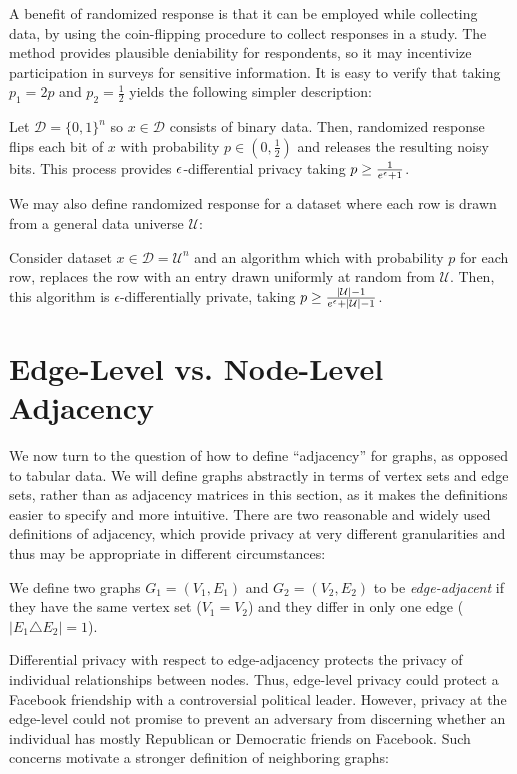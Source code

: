 A benefit of randomized response is that it can be employed while collecting data, by using the coin-flipping procedure to collect responses in a study. The method provides plausible deniability for respondents, so it may incentivize participation in surveys for sensitive information.  It is easy to verify that taking $p_1 = 2p$ and $p_2 = \frac{1}{2}$ yields the following simpler description:

\begin{theorem}
	\label{thm:rr}
	Let $\mathcal{D} = \{0,1\}^n$ so $x \in \mathcal{D}$ consists of binary data. Then, randomized response flips each bit of $x$ with probability $p \in (0, \frac{1}{2})$ and releases the resulting noisy bits. This process provides $\epsilon$-differential privacy taking  $p \geq \frac{1}{e^\epsilon + 1}$.
\end{theorem}

 We may also define randomized response for a dataset where each row is drawn from a general data universe $\mathcal{U}$:

\begin{theorem}
\label{thm:rr_gen} Consider dataset $x \in \mathcal{D} = \mathcal{U}^n$ and an algorithm which with probability $p$ for each row, replaces the row with an entry drawn uniformly at random from $\mathcal{U}$. Then, this algorithm is $\epsilon$-differentially private, taking $p \geq \frac{|\mathcal{U}| - 1}{e^{\epsilon} + |\mathcal{U}| - 1 }$.
\end{theorem}

\section{Edge-Level vs. Node-Level Adjacency}

We now turn to the question of how to define ``adjacency'' for graphs, as opposed to tabular data. We will define graphs abstractly in terms of vertex sets and edge sets, rather than as adjacency matrices in this section, as it makes the definitions easier to specify and more intuitive. There are two reasonable and widely used definitions of adjacency, which provide privacy at very different granularities and thus may be appropriate in different circumstances: 

\begin{definition}
\label{def:edge_level}
We define two graphs $G_1 = (V_1, E_1)$ and $G_2 = (V_2, E_2)$ to be \emph{edge-adjacent} if they have the same vertex set ($V_1 = V_2$) and they differ in only one edge ($\left| E_1 \triangle E_2   \right| = 1$). 
\end{definition}
Differential privacy with respect to edge-adjacency protects the privacy of individual relationships between nodes. Thus, edge-level privacy could protect a Facebook friendship with a controversial political leader. However, privacy at the edge-level could not promise to prevent an adversary from discerning whether an individual has mostly Republican or Democratic friends on Facebook. Such concerns motivate a stronger definition of neighboring graphs:


